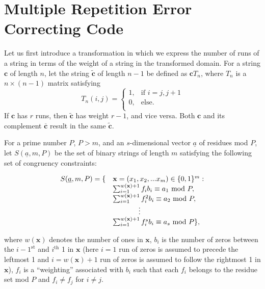 \section{Multiple Repetition Error Correcting
Code}\label{construction}

Let us first introduce a transformation in which we express the
number of runs of a string in terms of the weight of a string in
the transformed domain. For a string $\mathbf{c}$ of length $n$,
let the string $\tilde{\mathbf{c}}$ of length $n-1$ be defined as
$\mathbf{c}T_n$, where $T_n$ is a $n \times (n-1)$ matrix
satisfying\vspace{-0.0in}\begin{equation}\label{eq:t}T_{n}(i,j)=\left\{
\begin{array}{lll}
    1, & \text{if }i = j,j+1\\
    0, & \text{else.} \\
\end{array} \right. \end{equation}
If $\mathbf{c}$ has $r$ runs, then $\mathbf{\tilde{c}}$ has weight
$r-1$, and vice versa. Both $\mathbf{c}$ and its complement
$\mathbf{\overline{c}}$ result in the same $\mathbf{\tilde{c}}$.

 For
a prime number $P$, $P > m$, and an $s$-dimensional vector
$\underline{a}$ of residues mod $P$, let $S(\underline{a},m,P)$ be
the set of binary strings of length $m$ satisfying the following
set of congruency constraints:

\begin{equation}\label{eq1}\begin{array}{lll}S(\underline{a},m,P) = \{ & \mathbf{x}=(x_1, x_2, ... x_m) \in \{0,1\}^m
:\\ {} & \sum_{i=1}^{w(\mathbf{x})+1} f_ib_i \equiv a_1 \text{ mod } P,\\
{} & \sum_{i=1}^{w(\mathbf{x})+1} f_i^2b_i
\equiv a_2 \text{ mod } P,\\
{} & \hspace{0.5in}\vdots\\ {} & \sum_{i=1}^{w(\mathbf{x})+1}
f_i^sb_i \equiv a_s \text{ mod } P\},\end{array}\end{equation}

where $w(\mathbf{x})$ denotes the number of ones in $\mathbf{x}$,
$b_i$ is the number of zeros between the $i-1^{\text{st}}$ and
$i^{\text{th}}$ 1 in $\mathbf{x}$ (here $i=1$ run of zeros is
assumed to precede the leftmost 1 and $i=w(\mathbf{x})+1$ run of
zeros is assumed to follow the rightmost 1 in $\mathbf{x}$), $f_i$
is a ``weighting'' associated with $b_i$ such that each $f_i$
belongs to the residue set mod $P$ and $f_i \neq f_j$ for $i \neq
j$.


